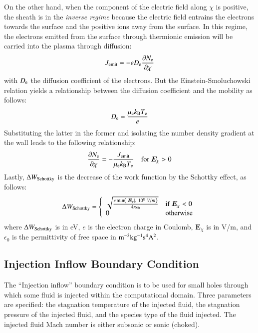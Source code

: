 \documentclass{warpdoc}
\renewcommand{\vec}[1]{\bm{#1}}
\begin{document}
On the other hand, when the component of the electric field along $\chi$ is positive, the sheath is in the \emph{inverse regime} because the electric field entrains the electrons towards the surface and the positive ions away from the surface. In this regime, the electrons emitted from the surface through thermionic emission will be carried into the plasma through diffusion:
%
\begin{equation}
 J_{\rm emit}= - e D_{\rm e} \frac{\partial N_{\rm e}}{\partial \chi}
\end{equation}
%
with $D_{\rm e}$ the diffusion coefficient of the electrons.
But the Einstein-Smoluchowski relation yields a relationship between the diffusion coefficient and the mobility as follows: 
%
\begin{equation}
  D_{\rm e}=\frac{\mu_{\rm e} k_{\rm B} T_{\rm e}}{e}
\end{equation}
%
Substituting the latter in the former and isolating the number density gradient at the wall leads to the following relationship:
%
\begin{equation}
 \frac{\partial N_{\rm e}}{\partial \chi} = -\frac{J_{\rm emit}}{\mu_{\rm e} k_{\rm B} T_{\rm e}}~~~~{\rm for~}\vec{E}_\chi>0
\end{equation}
%
Lastly, $\Delta W_{\rm Schottky}$ is the decrease of the work function by the Schottky effect, as follows:
%
\begin{equation}
 \Delta W_{\rm Schottky} = 
 \left\{ \begin{array}{ll}
 \sqrt{\frac{e \min\left(|\vec{E}_\chi|,~10^8~V/m\right)}{4 \pi \epsilon_0}}  & \textrm{if}~\vec{E}_\chi<0 \\
 0 & \textrm{otherwise} \\
 \end{array}  \right.
\end{equation}
%
where $\Delta W_{\rm Schottky}$ is in eV, $e$ is the electron charge in Coulomb, $\vec{E}_\chi$ is in V/m, and $\epsilon_0$ is the permittivity of free space in $\rm m^{-3} kg^{-1} s^4 A^2$. 



\subsection{Injection Inflow Boundary Condition}

The ``Injection inflow'' boundary condition is to be used for small holes through which some fluid is injected within the computational domain. Three parameters are specified: the stagnation temperature of the injected fluid, the stagnation pressure of the injected fluid, and the species type of the fluid injected. The injected fluid Mach number is either subsonic or sonic (choked).
\end{document}
